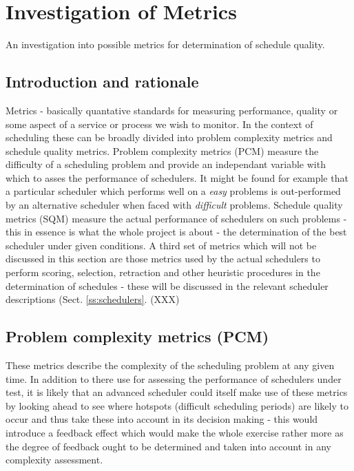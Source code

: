 \section{Investigation of Metrics}
\label{sect:metrics_study}
An investigation into possible metrics for determination of schedule quality.

\subsection{Introduction and rationale}
Metrics - basically quantative standards for measuring performance, quality or some aspect of a service or process we wish to monitor. In the context of scheduling these can be broadly divided into problem complexity metrics and schedule quality metrics. Problem complexity metrics (PCM) measure the difficulty of a scheduling problem and provide an independant variable with which to asses the performance of schedulers. It might be found for example that a particular scheduler which performs well on a \emph{easy} problems is out-performed by an alternative scheduler when faced with \emph{difficult} problems. Schedule quality metrics (SQM) measure the actual performance of schedulers on such problems - this in essence is what the whole project is about - the determination of the best scheduler under given conditions. A third set of metrics which will not be discussed in this section are those metrics used by the actual schedulers to perform scoring, selection, retraction and other heuristic procedures in the determination of schedules - these will be discussed in the relevant scheduler descriptions (Sect. \ref{ss:schedulers}. (XXX)


\subsection{Problem complexity metrics (PCM)}
\label{ss:pcm}
These metrics describe the complexity of the scheduling problem at any given time. In addition to there use for assessing the performance of schedulers under test, it is likely that an advanced scheduler could itself make use of these metrics by looking ahead to see where hotspots (difficult scheduling periods) are likely to occur and thus take these into account in its decision making - this would introduce a feedback effect which would make the whole exercise rather more as the degree of feedback ought to be determined and taken into account in any complexity assessment.


